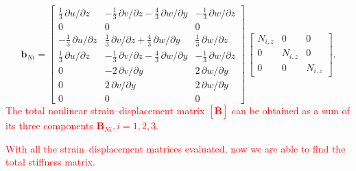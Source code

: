 \begin{equation}
\mathbf{b}_{Ni} = \begin{bmatrix}
\tfrac{1}{3} \, \partial u / \partial z &  - \tfrac{1}{3} \, \partial v / \partial z - \tfrac{4}{3} \, \partial w / \partial y & - \tfrac{1}{3} \, \partial w / \partial z   \\
0 &  0 & 0  \\
- \tfrac{1}{3} \, \partial u / \partial z &  \tfrac{1}{3} \, \partial v / \partial z + \tfrac{4}{3} \, \partial w / \partial y & \tfrac{1}{3} \, \partial w / \partial z \\
\tfrac{1}{3} \, \partial u / \partial z &  - \tfrac{1}{3} \, \partial v / \partial z - \tfrac{4}{3} \, \partial w / \partial y & - \tfrac{1}{3} \, \partial w / \partial z \\
0 &  -2 \, \partial v / \partial y & 2\, \partial w/\partial y  \\
0 &  2 \, \partial v / \partial y & 2 \, \partial w / \partial y  \\
0 &  0 &  0 \end{bmatrix} \, \begin{bmatrix}
N_{i,z} &  0 & 0  \\
0 & N_{i,z} & 0  \\
0 & 0 & N_{i,z}  \end{bmatrix}.
\end{equation}
\textcolor{red}{The total nonlinear strain--displacement matrix $[\overline{\mathbf{B}}]$ can be obtained as a sum of its three components $\mathbf{B}_{Ni}, i=1, 2, 3$.}

\textcolor{red}{With all the strain--displacement matrices evaluated, now we are able to find the total stiffness matrix.}

